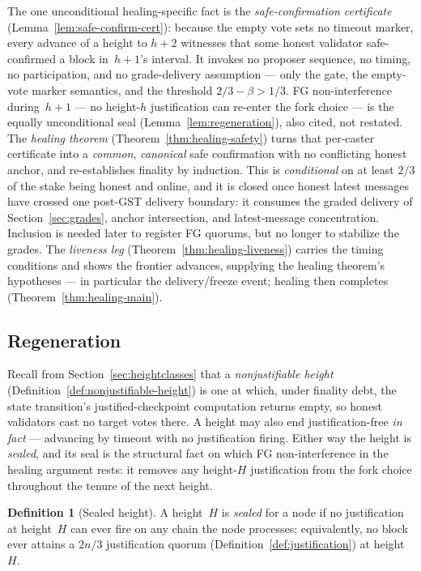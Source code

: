 \ifx\litemode\undefined\documentclass{article}\fi
\newcommand{\GST}{\ensuremath{\mathrm{GST}}\xspace}
\theoremstyle{plain}
\theoremstyle{definition}
\newtheorem{definition}{Definition}
\theoremstyle{remark}
\begin{document}
The one unconditional healing-specific fact is the \emph{safe-confirmation
certificate} (Lemma~\ref{lem:safe-confirm-cert}): because the empty vote sets no
timeout marker, every advance of a height to \(h+2\) witnesses that some honest
validator safe-confirmed a block in~\(h+1\)'s interval.  It invokes no proposer
sequence, no timing, no participation, and no grade-delivery assumption --- only the gate, the
empty-vote marker semantics, and the threshold \(2/3-\beta>1/3\).  FG
non-interference during~\(h+1\) --- no height-\(h\) justification can re-enter the
fork choice --- is the equally unconditional seal (Lemma~\ref{lem:regeneration}),
also cited, not restated.
The \emph{healing theorem} (Theorem~\ref{thm:healing-safety}) turns that per-caster
certificate into a \emph{common}, \emph{canonical} safe confirmation with no
conflicting honest anchor, and re-establishes finality by induction.  This is
\emph{conditional} on at least \(2/3\) of the stake being honest and online, and it
is closed once honest latest messages have crossed one post-\GST{} delivery
boundary: it consumes the graded delivery of Section~\ref{sec:grades}, anchor
intersection, and latest-message concentration.  Inclusion is needed later to
register FG quorums, but no longer to stabilize the grades.
The \emph{liveness leg} (Theorem~\ref{thm:healing-liveness}) carries the timing
conditions and shows the frontier advances, supplying the healing theorem's
hypotheses --- in particular the delivery/freeze event; healing then completes
(Theorem~\ref{thm:healing-main}).

\subsection{Regeneration}\label{sec:regeneration}

Recall from Section~\ref{sec:heightclasses} that a \emph{nonjustifiable height}
(Definition~\ref{def:nonjustifiable-height}) is one at which, under finality
debt, the state transition's justified-checkpoint computation returns empty, so
honest validators cast no target votes there.  A height may also end
justification-free \emph{in fact} --- advancing by timeout with no justification
firing.  Either way the height is \emph{sealed}, and its seal is the structural
fact on which FG non-interference in the healing argument rests: it removes any
height-\(H\) justification from the fork choice throughout the tenure of the
next height.

\begin{definition}[Sealed height]\label{def:sealed}
A height~\(H\) is \emph{sealed} for a node if no justification at height~\(H\)
can ever fire on any chain the node processes; equivalently, no block ever
attains a \(2n/3\) justification quorum (Definition~\ref{def:justification}) at
height~\(H\).
\end{definition}
\end{document}
